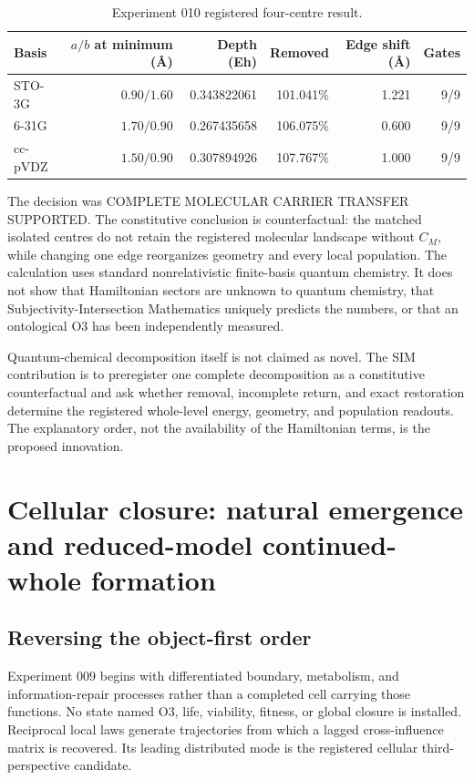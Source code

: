 \documentclass[11pt,a4paper]{article}
\begin{document}
\begin{table}[H]
\centering
\footnotesize
\caption{Experiment 010 registered four-centre result.}
\begin{tabular}{@{}lrrrrr@{}}
\toprule
Basis & $a/b$ at minimum (\AA) & Depth (Eh) & Removed & Edge shift (\AA) & Gates \\
\midrule
STO-3G & $0.90/1.60$ & 0.343822061 & 101.041\% & 1.221 & 9/9 \\
6-31G & $1.70/0.90$ & 0.267435658 & 106.075\% & 0.600 & 9/9 \\
cc-pVDZ & $1.50/0.90$ & 0.307894926 & 107.767\% & 1.000 & 9/9 \\
\bottomrule
\end{tabular}
\end{table}

The decision was \textsf{COMPLETE MOLECULAR CARRIER TRANSFER SUPPORTED}. The constitutive conclusion is counterfactual: the matched isolated centres do not retain the registered molecular landscape without $C_M$, while changing one edge reorganizes geometry and every local population. The calculation uses standard nonrelativistic finite-basis quantum chemistry. It does not show that Hamiltonian sectors are unknown to quantum chemistry, that Subjectivity-Intersection Mathematics uniquely predicts the numbers, or that an ontological O3 has been independently measured.

Quantum-chemical decomposition itself is not claimed as novel. The SIM contribution is to preregister one complete decomposition as a constitutive counterfactual and ask whether removal, incomplete return, and exact restoration determine the registered whole-level energy, geometry, and population readouts. The explanatory order, not the availability of the Hamiltonian terms, is the proposed innovation.

\section{Cellular closure: natural emergence and reduced-model continued-whole formation}

\subsection{Reversing the object-first order}

Experiment 009 begins with differentiated boundary, metabolism, and information-repair processes rather than a completed cell carrying those functions. No state named O3, life, viability, fitness, or global closure is installed. Reciprocal local laws generate trajectories from which a lagged cross-influence matrix is recovered. Its leading distributed mode is the registered cellular third-perspective candidate.
\end{document}
